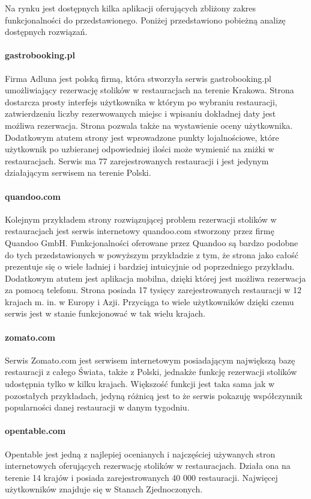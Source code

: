 \documentclass{article}
\begin{document}
Na rynku jest dostępnych kilka aplikacji oferujących zbliżony zakres funkcjonalności do przedstawionego. Poniżej przedstawiono pobieżną analizę dostępnych rozwiązań.

\paragraph{gastrobooking.pl}
Firma Adluna jest polską firmą, która stworzyła serwis gastrobooking.pl umożliwiający rezerwację stolików w restauracjach na terenie Krakowa. Strona dostarcza prosty interfejs użytkownika w którym po wybraniu restauracji, zatwierdzeniu liczby rezerwowanych miejsc i wpisaniu dokładnej daty jest możliwa rezerwacja. Strona pozwala także na wystawienie oceny użytkownika. Dodatkowym atutem strony jest wprowadzone punkty lojalnościowe, które użytkownik po uzbieranej odpowiedniej ilości może wymienić na zniżki w restauracjach. Serwis ma 77 zarejestrowanych restauracji i jest jedynym działającym serwisem na terenie Polski. 

\paragraph{quandoo.com}
Kolejnym przykładem strony rozwiązującej problem rezerwacji stolików w restauracjach jest serwis internetowy quandoo.com stworzony przez firmę Quandoo GmbH. Funkcjonalności oferowane przez Quandoo są bardzo podobne do tych przedstawionych w powyższym przykładzie z tym, że strona jako całość prezentuje się o wiele ładniej i bardziej intuicyjnie od poprzedniego przykładu. Dodatkowym atutem jest aplikacja mobilna, dzięki której jest możliwa rezerwacja za pomocą telefonu. Strona posiada 17 tysięcy zarejestrowanych restauracji w 12 krajach m. in. w Europy i Azji. Przyciąga to wiele użytkowników dzięki czemu serwis jest w stanie funkcjonować w tak wielu krajach.

\paragraph{zomato.com}
Serwis Zomato.com jest serwisem internetowym posiadającym największą bazę restauracji z całego Świata, także z Polski, jednakże funkcję rezerwacji stolików udostępnia tylko w kilku krajach. Większość funkcji jest taka sama jak w pozostałych przykładach, jedyną różnicą jest to że serwis pokazuję współczynnik popularności danej restauracji w danym tygodniu.

\paragraph{opentable.com}
Opentable jest jedną z najlepiej ocenianych i najczęściej używanych stron internetowych oferujących rezerwację stolików w restauracjach. Działa ona na terenie 14 krajów i posiada zarejestrowanych 40 000 restauracji. Najwięcej użytkowników znajduje się w Stanach Zjednoczonych.
\end{document}
